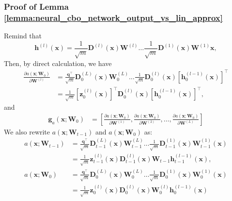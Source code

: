 \subsubsection{Proof of Lemma \ref{lemma:neural_cbo_network_output_vs_lin_approx}}


Remind that 
\begin{equation*}
    \mathbf{h}^{(l)}(\mathbf{x}) = \frac{1}{\sqrt{m}} \mathbf{D}^{(l)}(\mathbf{x}) \mathbf{W}^{(l)} \dots \frac{1}{\sqrt{m}} \mathbf{D}^{(1)}(\mathbf{x}) \mathbf{W}^{(1)} \mathbf{x},
\end{equation*}
Then, by direct calculation, we have
\begin{align*}
 \frac{\partial a(\mathbf{x}; \mathbf{W}_0)}{\partial \mathbf{W}^{(l)}}  &= \frac{\mathbf{q}^\top}{\sqrt{m}} \mathbf{D}_0^{(L)}(\mathbf{x}) \mathbf{W}_0^{(L)} \dots \frac{1}{\sqrt{m}} \mathbf{D}_0^{(l)}(\mathbf{x}) \left[\mathbf{h}_0^{(l-1)}(\mathbf{x}) \right] ^\top
 \\
 &= \frac{1}{\sqrt{m}} [\mathbf{z}_0^{(l)}(\mathbf{x})]^\top \mathbf{D}_0^{(l)}(\mathbf{x})\left[\mathbf{h}_0^{(l-1)}(\mathbf{x}) \right] ^\top,
\end{align*}
and 
\begin{align*}
    \mathbf{g}_{a}(\mathbf{x}; \mathbf{W}_0) &= \left [ \frac{\partial a(\mathbf{x}; \mathbf{W}_0)}{\partial \mathbf{W}^{(1)}}, \frac{\partial a(\mathbf{x}; \mathbf{W}_0)}{\partial \mathbf{W}^{(2)}}, \dots, \frac{\partial a(\mathbf{x}; \mathbf{W}_0)}{\partial \mathbf{W}^{(L)}} \right]
\end{align*}
We also rewrite $a(\mathbf{x}; \mathbf{W}_{t-1})$ and $a(\mathbf{x}; \mathbf{W}_{0})$  as:
\begin{align*}
    a(\mathbf{x}; \mathbf{W}_{t-1}) &= \frac{\mathbf{q}^\top}{\sqrt{m}} \mathbf{D}_{t-1}^{(L)}(\mathbf{x}) \mathbf{W}_{t-1}^{(L)} \dots \frac{1}{\sqrt{m}} \mathbf{D}_{t-1}^{(1)}(\mathbf{x}) \mathbf{W}_{t-1}^{(1)} (\mathbf{x}) 
    \\
    & = \frac{1}{\sqrt{m}} \mathbf{z}_{t-1}^{(l)} (\mathbf{x}) \mathbf{D}_{t-1}^{(l)} (\mathbf{x}) \mathbf{W}_{t-1}  \mathbf{h}_{t-1}^{(l-1)} (\mathbf{x}),
    \\
    a(\mathbf{x}; \mathbf{W}_{0}) &= \frac{\mathbf{q}^\top}{\sqrt{m}} \mathbf{D}_{0}^{(L)}(\mathbf{x}) \mathbf{W}_{0}^{(L)} \dots \frac{1}{\sqrt{m}} \mathbf{D}_{0}^{(1)}(\mathbf{x}) \mathbf{W}_{0}^{(1)} (\mathbf{x})
    \\
    & = \frac{1}{\sqrt{m}} \mathbf{z}_{0}^{(l)} (\mathbf{x}) \mathbf{D}_{0}^{(l)} (\mathbf{x}) \mathbf{W}_{0}^{(l)}  \mathbf{h}_{0}^{(l-1)} (\mathbf{x})
\end{align*} 

